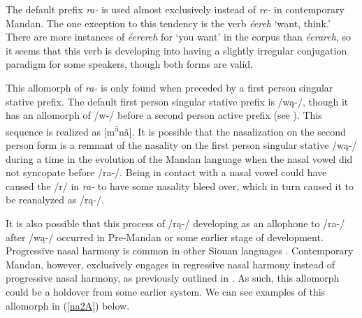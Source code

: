The default prefix \textit{ra-} is used almost exclusively instead of \textit{re-} in contemporary Mandan. The one exception to this tendency is the verb \textit{éereh} `want, think.' There are more instances of \textit{éerereh} for `you want' in the corpus than \textit{éerareh}, so it seems that this verb is developing into having a slightly irregular conjugation paradigm for some speakers, though both forms are valid.


This allomorph of \textit{ra-} is only found when preceded by a first person singular stative prefix. The default first person singular stative prefix is /wą-/, though it has an allomorph of /w-/ before a second person active prefix (see ). This sequence is realized as [m\textsuperscript{ã}nã]. It is possible that the nasalization on the second person form is a remnant of the nasality on the first person singular stative /wą-/ during a time in the evolution of the Mandan language when the nasal vowel did not syncopate before /ra-/. Being in contact with a nasal vowel could have caused the /r/ in \textit{ra-} to have some nasality bleed over, which in turn caused it to be reanalyzed as /rą-/.

It is also possible that this process of /rą-/ developing as an allophone to /ra-/ after /wą-/ occurred in Pre-Mandan or some earlier stage of development. Progressive nasal harmony is common in other Siouan languages \citep{kasaklundquist2019}. Contemporary Mandan, however, exclusively engages in regressive nasal harmony instead of progressive nasal harmony, as previously outlined in . As such, this allomorph could be a holdover from some earlier system. We can see examples of this allomorph in (\ref{na2A}) below.

